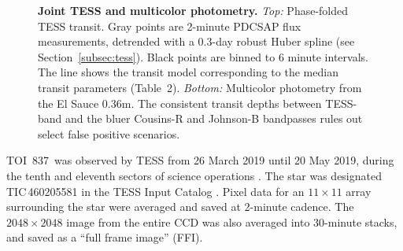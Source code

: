 \documentclass[12pt,twocolumn,tighten]{aastex62}
\newcommand{\tn}{TOI~837} %
\begin{document}
\begin{figure}[t]
	\begin{center}
		\leavevmode
		
		\vspace{-0.5cm}
	\end{center}
	\vspace{-0.7cm}
  \caption{
    {\bf Joint TESS and multicolor photometry.} {\it Top:}
    Phase-folded TESS transit. Gray points are 2-minute PDCSAP flux
    measurements, detrended with a 0.3-day robust Huber spline (see
    Section~\ref{subsec:tess}).  Black points are binned to 6 minute
    intervals.  The line shows the transit model corresponding to the
    median transit parameters (Table~2).  {\it Bottom:} Multicolor
    photometry from the El Sauce 0.36m.  The consistent transit depths
    between TESS-band and the bluer Cousins-R and Johnson-B bandpasses
    rules out select false positive scenarios.
    \label{fig:jointphot}
	}
\end{figure}

\tn\ was observed by TESS from 26 March 2019 until 20 May 2019, during
the tenth and eleventh sectors of science operations
\citep{ricker_transiting_2015}.  The star was designated
TIC\,460205581 in the TESS Input Catalog
\citep{stassun_TIC_2018,stassun_TIC8_2019}.  Pixel data for an
$11\times11$ array surrounding the star were averaged and saved at
2-minute cadence.  The $2048\times2048$ image from the entire CCD was
also averaged into 30-minute stacks, and saved as a ``full frame
image'' (FFI).
\end{document}
